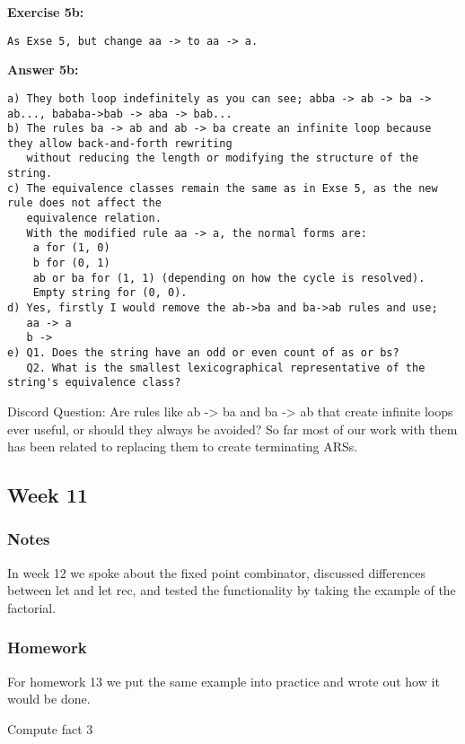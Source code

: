 \documentclass{article}
\theoremstyle{theorem}
\theoremstyle{definition}
\theoremstyle{remark}
\begin{document}
\textbf{Exercise 5b:}
\begin{verbatim}
As Exse 5, but change aa -> to aa -> a.
\end{verbatim}

\textbf{Answer 5b:}
\begin{verbatim}
a) They both loop indefinitely as you can see; abba -> ab -> ba -> ab..., bababa->bab -> aba -> bab...
b) The rules ba -> ab and ab -> ba create an infinite loop because they allow back-and-forth rewriting
   without reducing the length or modifying the structure of the string.
c) The equivalence classes remain the same as in Exse 5, as the new rule does not affect the 
   equivalence relation.
   With the modified rule aa -> a, the normal forms are:
    a for (1, 0)
    b for (0, 1)
    ab or ba for (1, 1) (depending on how the cycle is resolved).
    Empty string for (0, 0).
d) Yes, firstly I would remove the ab->ba and ba->ab rules and use;
   aa -> a
   b ->
e) Q1. Does the string have an odd or even count of as or bs?
   Q2. What is the smallest lexicographical representative of the string's equivalence class?
\end{verbatim}

Discord Question: Are rules like ab -> ba and ba -> ab that create infinite loops ever useful, or should they always be avoided? So far most of our work with them has been related to replacing them to create terminating ARSs.

\subsection{Week 11}
\subsubsection*{Notes}
In week 12 we spoke about the fixed point combinator, discussed differences between let and let rec, and tested the functionality by taking the example of the factorial.

\subsubsection*{Homework}
For homework 13 we put the same example into practice and wrote out how it would be done.

Compute fact 3
\end{document}
